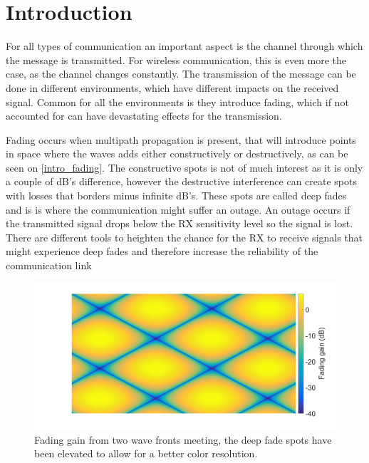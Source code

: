 \chapter{Introduction}

%





For all types of communication an important aspect is the channel through which the message is transmitted. For wireless communication, this is even more the case, as the channel changes constantly. The transmission of the message can be done in different environments, which have different impacts on the received signal. Common for all the environments is they introduce fading, which if not accounted for can have devastating effects for the transmission. 

Fading occurs when multipath propagation is present, that will introduce points in space where the waves adds either constructively or destructively, as can be seen on \autoref{intro_fading}. The constructive spots is not of much interest as it is only a couple of dB's difference, however the destructive interference can create spots with losses that borders minus infinite dB's. These spots are called deep fades and is is where the communication might suffer an outage. An outage occurs if the transmitted signal drops below the RX sensitivity level so the signal is lost. There are different tools to heighten the chance for the RX to receive signals that might experience deep fades and therefore increase the reliability of the communication link


\begin{figure}[H]
\centering
\includegraphics[width=\textwidth]{figures/intro_fading.png}
\caption{Fading gain from two wave fronts meeting, the deep fade spots have been elevated to allow for a better color resolution.}
\label{intro_fading}
\end{figure}

